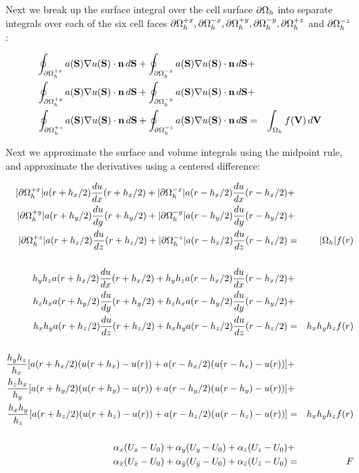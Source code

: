 \documentclass[10pt]{article}
\begin{document}
Next we break up the surface integral over the cell surface $\partial{\Omega_h}$
into separate integrals over each of the six cell faces
$\partial\Omega_h^{+x},\partial\Omega_h^{-x},\partial\Omega_h^{+y},\partial\Omega_h^{-y},\partial\Omega_h^{+z}$ and $\partial\Omega_h^{-z}$:

 \begin{eqnarray*}
 \oint_{\partial\Omega_h^{+x}} a(\textbf{S}) \nabla u(\textbf{S})\cdot \textbf{n} \, d\textbf{S} +  \oint_{\partial\Omega_h^{-x}} a(\textbf{S}) \nabla u(\textbf{S})\cdot \textbf{n} \, d\textbf{S} & + & \\
 \oint_{\partial\Omega_h^{+y}} a(\textbf{S}) \nabla u(\textbf{S})\cdot \textbf{n} \, d\textbf{S} +  \oint_{\partial\Omega_h^{-y}} a(\textbf{S}) \nabla u(\textbf{S})\cdot \textbf{n} \, d\textbf{S} & + & \\
 \oint_{\partial\Omega_h^{+z}} a(\textbf{S}) \nabla u(\textbf{S})\cdot \textbf{n} \, d\textbf{S} +  \oint_{\partial\Omega_h^{-z}} a(\textbf{S}) \nabla u(\textbf{S})\cdot \textbf{n} \, d\textbf{S} & = & \int_{\Omega_h} f(\textbf{V})\, d\textbf{V}
 \end{eqnarray*}

Next we approximate the surface and volume integrals using the
midpoint rule, and approximate the derivatives using a centered difference:

 \begin{eqnarray*}
 |\partial\Omega_h^{+x}| a(r+h_x/2) \frac{du}{dx}(r+h_x/2) + 
 |\partial\Omega_h^{-x}| a(r-h_x/2) \frac{du}{dx}(r-h_x/2) & + & \\ 
 |\partial\Omega_h^{+y}| a(r+h_y/2) \frac{du}{dy}(r+h_y/2) +
 |\partial\Omega_h^{-y}| a(r-h_y/2) \frac{du}{dy}(r-h_y/2) & + & \\ 
 |\partial\Omega_h^{+z}| a(r+h_z/2) \frac{du}{dz}(r+h_z/2) + 
 |\partial\Omega_h^{-z}| a(r-h_z/2) \frac{du}{dz}(r-h_z/2) & = & |{\Omega_h}| f(r)  \\
\\
 h_y h_z a(r+h_x/2) \frac{du}{dx}(r+h_x/2) + 
 h_y h_z a(r-h_x/2) \frac{du}{dx}(r-h_x/2) & + & \\ 
 h_z h_x a(r+h_y/2) \frac{du}{dy}(r+h_y/2) +
 h_z h_x a(r-h_y/2) \frac{du}{dy}(r-h_y/2) & + & \\ 
 h_x h_y a(r+h_z/2) \frac{du}{dz}(r+h_z/2) + 
 h_x h_y a(r-h_z/2) \frac{du}{dz}(r-h_z/2) & = & h_xh_yh_z f(r)  \\
\\
 \frac{h_y h_z}{h_x} [a(r+h_x/2) (u(r+h_x) - u(r))  + 
                      a(r-h_x/2) (u(r-h_x) - u(r))] & + & \\ 
 \frac{h_z h_x}{h_y} [a(r+h_y/2) (u(r+h_y) - u(r))  + 
                      a(r-h_y/2) (u(r-h_y) - u(r))] & + & \\ 
 \frac{h_x h_y}{h_z} [a(r+h_z/2) (u(r+h_z) - u(r))  + 
                      a(r-h_z/2) (u(r-h_z) - u(r))] & = &  h_xh_yh_z f(r)  \\
\\
 \alpha_{x} (U_{x} - U_{0})  + 
 \alpha_{y} (U_{y} - U_{0})  + 
 \alpha_{z} (U_{z} - U_{0}) & + & \\ 
 \alpha_{\bar{x}} (U_{\bar{x}} - U_{0})  + 
 \alpha_{\bar{y}} (U_{\bar{y}} - U_{0})  + 
 \alpha_{\bar{z}} (U_{\bar{z}} - U_{0}) & = &  F  \\
 \end{eqnarray*}
\end{document}
